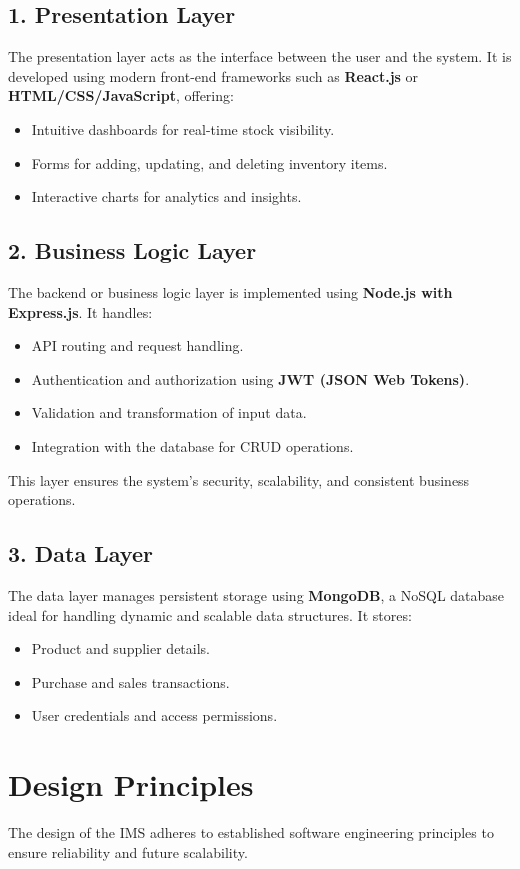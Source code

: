 \documentclass[12pt,a4paper]{article}
\begin{document}
\subsection*{1. Presentation Layer}
The presentation layer acts as the interface between the user and the system. It is developed using modern front-end frameworks such as \textbf{React.js} or \textbf{HTML/CSS/JavaScript}, offering:
\begin{itemize}
    \item Intuitive dashboards for real-time stock visibility.
    \item Forms for adding, updating, and deleting inventory items.
    \item Interactive charts for analytics and insights.
\end{itemize}

\subsection*{2. Business Logic Layer}
The backend or business logic layer is implemented using \textbf{Node.js with Express.js}. It handles:
\begin{itemize}
    \item API routing and request handling.
    \item Authentication and authorization using \textbf{JWT (JSON Web Tokens)}.
    \item Validation and transformation of input data.
    \item Integration with the database for CRUD operations.
\end{itemize}

This layer ensures the system’s security, scalability, and consistent business operations.

\subsection*{3. Data Layer}
The data layer manages persistent storage using \textbf{MongoDB}, a NoSQL database ideal for handling dynamic and scalable data structures. It stores:
\begin{itemize}
    \item Product and supplier details.
    \item Purchase and sales transactions.
    \item User credentials and access permissions.
\end{itemize}

\section{Design Principles}
The design of the IMS adheres to established software engineering principles to ensure reliability and future scalability.
\end{document}
